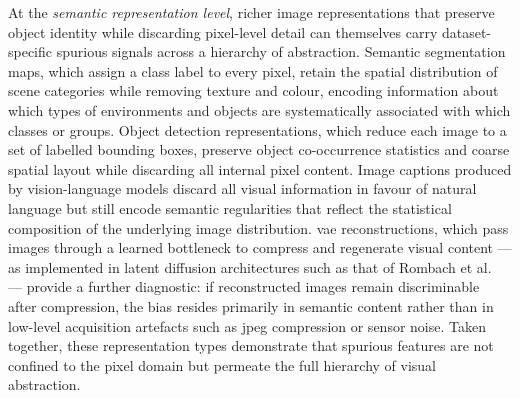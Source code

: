 
At the \emph{semantic representation level}, richer image representations that preserve
object identity while discarding pixel-level detail can themselves carry dataset-specific
spurious signals across a hierarchy of abstraction. Semantic segmentation maps, which assign
a class label to every pixel, retain the spatial distribution of scene categories while
removing texture and colour, encoding information about which types of environments and
objects are systematically associated with which classes or groups. Object detection
representations, which reduce each image to a set of labelled bounding boxes, preserve
object co-occurrence statistics and coarse spatial layout while discarding all internal pixel
content. Image captions produced by vision-language models discard all visual information in
favour of natural language but still encode semantic regularities that reflect the statistical
composition of the underlying image distribution. \acrshort{vae} reconstructions, which pass
images through a learned bottleneck to compress and regenerate visual content --- as
implemented in latent diffusion architectures such as that of Rombach et
al.~\cite{Rombach_2022_CVPR} --- provide a further diagnostic: if reconstructed images
remain discriminable after compression, the bias resides primarily in semantic content rather
than in low-level acquisition artefacts such as jpeg compression or sensor noise.
Taken together, these representation types demonstrate that spurious features are not
confined to the pixel domain but permeate the full hierarchy of visual abstraction.


